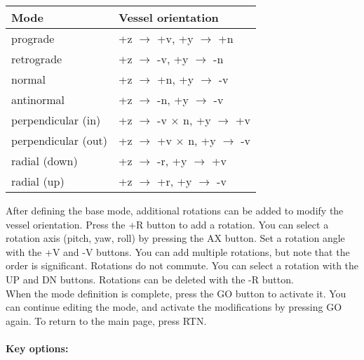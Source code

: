 \documentclass[Orbiter User Manual.tex]{subfiles}
\begin{document}
	\begin{longtable}{ |p{}|p{}| }
	\hline\rule{0pt}{2ex}
	\textbf{Mode} & \textbf{Vessel orientation}\\
	\hline\rule{0pt}{2ex}
	prograde & +z $\rightarrow$ +v, +y $\rightarrow$ +n\\
	\hline\rule{0pt}{2ex}
	retrograde & +z $\rightarrow$ -v, +y $\rightarrow$ -n\\
	\hline\rule{0pt}{2ex}
	normal & +z $\rightarrow$ +n, +y $\rightarrow$ -v\\
	\hline\rule{0pt}{2ex}
	antinormal & +z $\rightarrow$ -n, +y $\rightarrow$ -v\\
	\hline\rule{0pt}{2ex}
	perpendicular (in) & +z $\rightarrow$ -v $\times$ n, +y $\rightarrow$ +v\\
	\hline\rule{0pt}{2ex}
	perpendicular (out) & +z $\rightarrow$ +v $\times$ n, +y $\rightarrow$ -v\\
	\hline\rule{0pt}{2ex}
	radial (down) & +z $\rightarrow$ -r, +y $\rightarrow$ +v\\
	\hline\rule{0pt}{2ex}
	radial (up) & +z $\rightarrow$ +r, +y $\rightarrow$ -v\\
	\hline
	\end{longtable}

\noindent
After defining the base mode, additional rotations can be added to modify the vessel orientation. Press the +R button to add a rotation. You can select a rotation axis (pitch, yaw, roll) by pressing the AX button. Set a rotation angle with the +V and -V buttons. You can add multiple rotations, but note that the order is significant. Rotations do not commute. You can select a rotation with the UP and DN buttons. Rotations can be deleted with the -R button.\\
When the mode definition is complete, press the GO button to activate it. You can continue editing the mode, and activate the modifications by pressing GO again. To return to the main page, press RTN.\\
\\
\textbf{Key options:}
\end{document}

